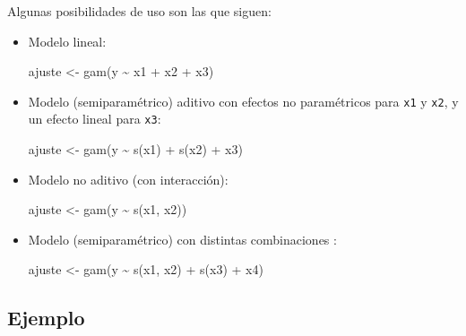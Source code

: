 \documentclass[
]{book}
\newenvironment{Shaded}{\begin{snugshade}}{\end{snugshade}}
\newcommand{\FunctionTok}[1]{\textcolor[rgb]{0.00,0.00,0.00}{#1}}
\newcommand{\NormalTok}[1]{#1}
\newcommand{\OtherTok}[1]{\textcolor[rgb]{0.56,0.35,0.01}{#1}}
\newcommand{\SpecialCharTok}[1]{\textcolor[rgb]{0.00,0.00,0.00}{#1}}
\theoremstyle{break}
\theoremstyle{definition}
\theoremstyle{definition}
\theoremstyle{definition}
\theoremstyle{definition}
\theoremstyle{remark}
\begin{document}
Algunas posibilidades de uso son las que siguen:

\begin{itemize}
\item
  Modelo lineal:

\begin{Shaded}
\begin{Highlighting}[]
\NormalTok{ajuste }\OtherTok{\textless{}{-}} \FunctionTok{gam}\NormalTok{(y }\SpecialCharTok{\textasciitilde{}}\NormalTok{ x1 }\SpecialCharTok{+}\NormalTok{ x2 }\SpecialCharTok{+}\NormalTok{ x3)}
\end{Highlighting}
\end{Shaded}
\item
  Modelo (semiparamétrico) aditivo con efectos no paramétricos para \texttt{x1} y \texttt{x2}, y un efecto lineal para \texttt{x3}:

\begin{Shaded}
\begin{Highlighting}[]
\NormalTok{ajuste }\OtherTok{\textless{}{-}} \FunctionTok{gam}\NormalTok{(y }\SpecialCharTok{\textasciitilde{}} \FunctionTok{s}\NormalTok{(x1) }\SpecialCharTok{+} \FunctionTok{s}\NormalTok{(x2) }\SpecialCharTok{+}\NormalTok{ x3)}
\end{Highlighting}
\end{Shaded}
\item
  Modelo no aditivo (con interacción):

\begin{Shaded}
\begin{Highlighting}[]
\NormalTok{ajuste }\OtherTok{\textless{}{-}} \FunctionTok{gam}\NormalTok{(y }\SpecialCharTok{\textasciitilde{}} \FunctionTok{s}\NormalTok{(x1, x2))}
\end{Highlighting}
\end{Shaded}
\item
  Modelo (semiparamétrico) con distintas combinaciones :

\begin{Shaded}
\begin{Highlighting}[]
\NormalTok{ajuste }\OtherTok{\textless{}{-}} \FunctionTok{gam}\NormalTok{(y }\SpecialCharTok{\textasciitilde{}} \FunctionTok{s}\NormalTok{(x1, x2) }\SpecialCharTok{+} \FunctionTok{s}\NormalTok{(x3) }\SpecialCharTok{+}\NormalTok{ x4)}
\end{Highlighting}
\end{Shaded}
\end{itemize}

\hypertarget{ejemplo-3}{%
\subsection{Ejemplo}\label{ejemplo-3}}
\end{document}
